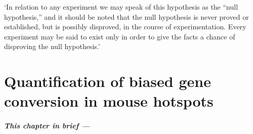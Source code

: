 \begin{savequote}[8cm]
	
	‘In relation to any experiment we may speak of this hypothesis as the “null hypothesis,” and it should be noted that the null hypothesis is never proved or established, but is possibly disproved, in the course of experimentation. Every experiment may be said to exist only in order to give the facts a chance of disproving the null hypothesis.’
	
	
\end{savequote}

\chapter{\label{ch:7-quantification-BGC}Quantification of biased gene conversion in mouse hotspots}


\minitoc{}

{\small{} \itshape{}

\paragraph{This chapter in brief —}


}

\newpage

\section{}
\subsection{}
\subsection{}
\subsection{}

